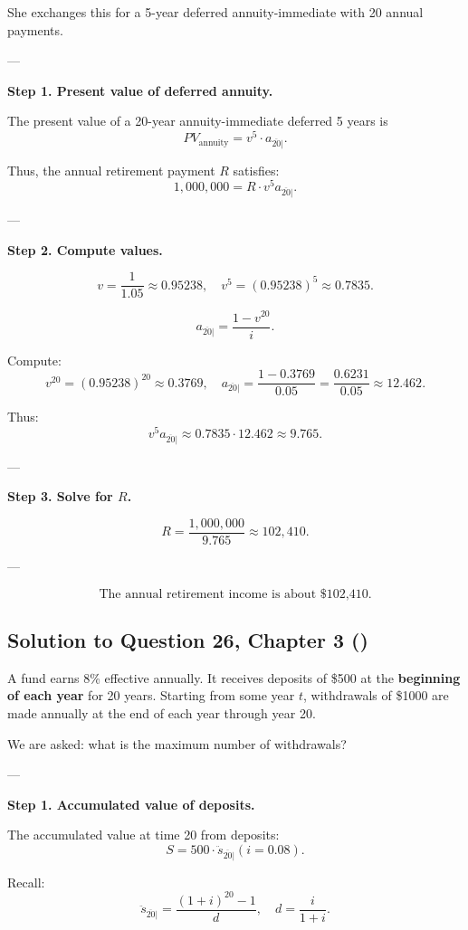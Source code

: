 \documentclass[12pt, a4paper]{article}
\begin{document}
She exchanges this for a 5-year deferred annuity-immediate with 20 annual payments.  

---

\textbf{Step 1. Present value of deferred annuity.}

The present value of a 20-year annuity-immediate deferred 5 years is
\[
PV_{\text{annuity}} = v^5 \cdot a_{\overline{20}|}.
\]

Thus, the annual retirement payment $R$ satisfies:
\[
1{,}000{,}000 = R \cdot v^5 a_{\overline{20}|}.
\]

---

\textbf{Step 2. Compute values.}

\[
v = \frac{1}{1.05} \approx 0.95238,
\quad v^5 = (0.95238)^5 \approx 0.7835.
\]

\[
a_{\overline{20}|} = \frac{1-v^{20}}{i}.
\]

Compute:
\[
v^{20} = (0.95238)^{20} \approx 0.3769,
\quad a_{\overline{20}|} = \frac{1-0.3769}{0.05} = \frac{0.6231}{0.05} \approx 12.462.
\]

Thus:
\[
v^5 a_{\overline{20}|} \approx 0.7835 \cdot 12.462 \approx 9.765.
\]

---

\textbf{Step 3. Solve for $R$.}

\[
R = \frac{1{,}000{,}000}{9.765} \approx 102,410.
\]

---

\[
\boxed{\text{The annual retirement income is about \$102,410.}}
\]

\subsection*{Solution to Question 26, Chapter 3 (\cite{toi3rd})}

A fund earns 8\% effective annually.  
It receives deposits of \$500 at the \textbf{beginning of each year} for 20 years.  
Starting from some year $t$, withdrawals of \$1000 are made annually at the end of each year through year 20.

We are asked: what is the maximum number of withdrawals?

---

\textbf{Step 1. Accumulated value of deposits.}

The accumulated value at time 20 from deposits:
\[
S = 500 \cdot \ddot{s}_{\overline{20}|}(i=0.08).
\]

Recall:
\[
\ddot{s}_{\overline{20}|} = \frac{(1+i)^{20}-1}{d}, 
\quad d=\frac{i}{1+i}.
\]
\end{document}
